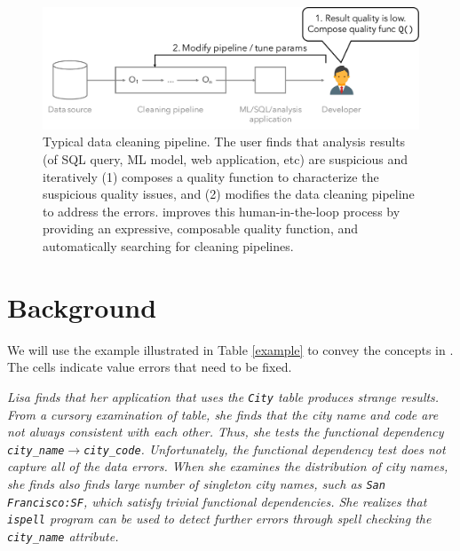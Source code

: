 \begin{figure}[t]
  \centering
 \includegraphics[width=\columnwidth]{figures/user-pipeline}
 \caption{\small Typical data cleaning pipeline.  The user finds that analysis results (of SQL query, ML model, web application, etc) are suspicious and iteratively (1) composes a quality function to characterize the suspicious quality issues, and (2) modifies the data cleaning pipeline to address the errors.  \sys improves this human-in-the-loop process by providing an expressive, composable quality function, and automatically searching for cleaning pipelines.  \label{fig:user-pipeline}}
\end{figure}


\section{Background}\label{s:background}
We will use the example illustrated in Table \ref{example} to convey the concepts in \sys.  The  cells indicate value errors that need to be fixed.

\begin{example}\it\label{e:1}
Lisa finds that her application that uses the \texttt{City} table produces strange results. From a cursory examination of table, she finds that the city name and code are not always consistent with each other.  Thus, she tests the functional dependency \texttt{city\_name$\rightarrow$city\_code}. Unfortunately, the functional dependency test does not capture all of the data errors. When she examines the distribution of city names, she finds also finds large number of singleton city names, such as \texttt{San Francisco:SF}, which satisfy trivial functional dependencies. She realizes that \texttt{ispell} program can be used to detect further errors through spell checking the \texttt{city\_name} attribute.
\end{example}

